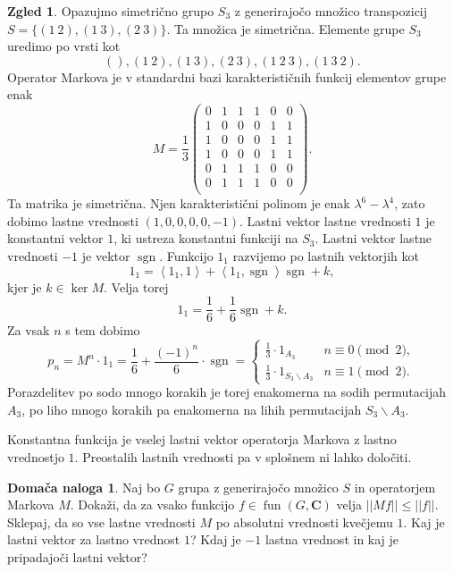 \documentclass[11pt]{book}
\def\CC{\mathbf{C}}
\DeclareMathOperator\sgn{sgn}
\DeclareMathOperator\fun{fun}
\theoremstyle{definition}
\theoremstyle{zgled}
\newtheorem*{zgled}{Zgled}
\theoremstyle{odprtproblem}
\theoremstyle{domacanaloga}
\newtheorem*{domacanaloga}{Domača naloga}
\theoremstyle{izrek}
\begin{document}
\begin{zgled}
Opazujmo simetrično grupo $S_3$ z generirajočo množico transpozicij $S = \{ (1 \ 2), (1 \ 3), (2 \ 3)\}$. Ta množica je simetrična. Elemente grupe $S_3$ uredimo po vrsti kot
\[
    (),
    (1 \ 2),
    (1 \ 3),
    (2 \ 3),
    (1 \ 2 \ 3),
    (1 \ 3 \ 2).
\]
Operator Markova je v standardni bazi karakterističnih funkcij 
elementov grupe enak
\[
    M = \frac13 \begin{pmatrix}
        0 & 1 & 1 & 1 & 0 & 0 \\
        1 & 0 & 0 & 0 & 1 & 1 \\
        1 & 0 & 0 & 0 & 1 & 1 \\
        1 & 0 & 0 & 0 & 1 & 1 \\
        0 & 1 & 1 & 1 & 0 & 0 \\
        0 & 1 & 1 & 1 & 0 & 0 \\
    \end{pmatrix}.
\]
Ta matrika je simetrična. Njen karakteristični polinom je enak $\lambda^6 - \lambda^4$, zato dobimo lastne vrednosti $(1,0,0,0,0,-1)$. Lastni vektor lastne vrednosti $1$ je konstantni vektor $1$, ki ustreza konstantni funkciji na $S_3$. Lastni vektor lastne vrednosti $-1$ je vektor $\sgn$. Funkcijo $1_1$ razvijemo po lastnih vektorjih kot
\[
    1_1 = 
    \left\langle 1_1, 1 \right\rangle +
    \left\langle 1_1, \sgn \right\rangle \sgn +
    k,
\]
kjer je $k \in \ker M$. Velja torej
\[
    1_1 =
    \frac{1}{6} + \frac{1}{6} \sgn + k.
\]
Za vsak $n$ s tem dobimo
\[
    p_n = M^n \cdot 1_1 = \frac{1}{6} + \frac{(-1)^n}{6} \cdot \sgn
    = \begin{cases}
        \frac{1}{3} \cdot 1_{A_3} & n \equiv 0 \pmod{2}, \\
        \frac{1}{3} \cdot 1_{S_3 \backslash A_3} & n \equiv 1 \pmod{2}.
    \end{cases}
\]
Porazdelitev po sodo mnogo korakih je torej enakomerna na sodih permutacijah $A_3$, po liho mnogo korakih pa enakomerna na lihih permutacijah $S_3 \backslash A_3$.
\end{zgled}

Konstantna funkcija je vselej lastni vektor operatorja Markova z lastno vrednostjo $1$. Preostalih lastnih vrednosti pa v splošnem ni lahko določiti.

\begin{domacanaloga}
Naj bo $G$ grupa z generirajočo množico $S$ in operatorjem Markova $M$. Dokaži, da za vsako funkcijo $f \in \fun(G,\CC)$ velja $||Mf|| \leq ||f||$. Sklepaj, da so vse lastne vrednosti $M$ po absolutni vrednosti kvečjemu $1$. Kaj je lastni vektor za lastno vrednost $1$? Kdaj je $-1$ lastna vrednost in kaj je pripadajoči lastni vektor?
\end{domacanaloga}
\end{document}
